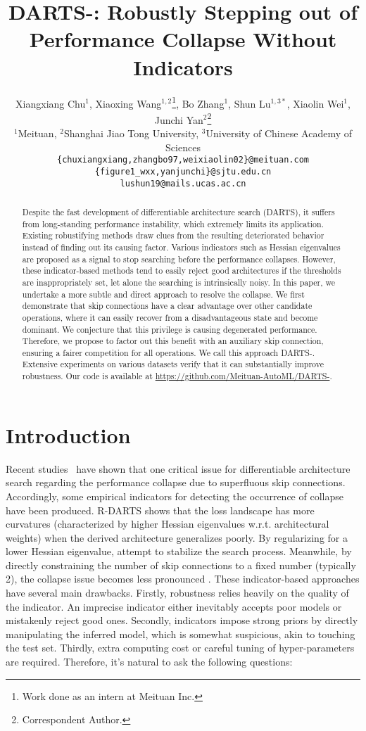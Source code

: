 \documentclass{article} \usepackage{iclr2021_conference,times}
\title{DARTS-: Robustly Stepping out of Performance Collapse Without Indicators}
\author{Xiangxiang Chu$^1$, Xiaoxing Wang$^{1,2}$\thanks{Work done as an intern at Meituan Inc.}, Bo Zhang$^1$, Shun Lu$^{1,3*}$,  Xiaolin Wei$^1$, Junchi Yan$^2$\thanks{Correspondent Author.} \\
	$^1$Meituan, $^2$Shanghai Jiao Tong University, $^3$University of Chinese Academy of Sciences\\
	\texttt{\{chuxiangxiang,zhangbo97,weixiaolin02\}@meituan.com} \\
	\texttt{\{figure1\_wxx,yanjunchi\}@sjtu.edu.cn} \\
    \texttt{lushun19@mails.ucas.ac.cn} \\
}
\begin{document}
\maketitle


\begin{abstract}

Despite the fast development of differentiable architecture search (DARTS), it suffers from long-standing performance instability, which extremely limits its application. Existing robustifying methods draw clues from the resulting deteriorated behavior instead of finding out its causing factor. Various indicators such as Hessian eigenvalues are proposed as a signal to stop searching before the performance collapses. However, these indicator-based methods tend to easily reject good architectures if the thresholds are inappropriately set, let alone the searching is intrinsically noisy. In this paper, we undertake a more subtle and direct approach to resolve the collapse. 
We first demonstrate that skip connections have a clear advantage over other candidate operations, where it can easily recover from a disadvantageous state and become dominant. We conjecture that this privilege is causing  degenerated performance. Therefore, we propose to factor out this benefit with an auxiliary skip connection, ensuring a fairer competition for all operations. We call this approach DARTS-.
Extensive experiments on various datasets verify that it can substantially improve robustness. Our code is available at \url{https://github.com/Meituan-AutoML/DARTS-}. 

\end{abstract}


\section{Introduction}
Recent studies~\citep{zela2020understanding,liang2019darts,chu2019fair} have shown that one critical issue for differentiable architecture search \citep{liu2018darts} regarding the performance collapse due to superfluous skip connections. Accordingly, some empirical indicators for detecting the occurrence of collapse have been produced. R-DARTS \citep{zela2020understanding} shows that the loss landscape has more curvatures (characterized by higher Hessian eigenvalues w.r.t. architectural weights) when the derived architecture generalizes poorly. By regularizing for a lower Hessian eigenvalue, \cite{zela2020understanding,chen2020stabilizing} attempt to stabilize the search process. Meanwhile, by directly constraining the number of skip connections to a fixed number (typically 2), the collapse issue becomes less pronounced \citep{chen2019progressive,liang2019darts}.
These indicator-based approaches have several main drawbacks. Firstly, robustness relies heavily on the quality of the indicator.  An imprecise indicator either inevitably accepts poor models or mistakenly reject good ones. Secondly, indicators impose strong priors by directly manipulating the inferred model, which is somewhat suspicious, akin to touching the test set. Thirdly, extra computing cost \citep{zela2020understanding} or careful tuning of hyper-parameters \citep{chen2019progressive,liang2019darts} are required. Therefore, it's natural to ask the following questions:
\end{document}
